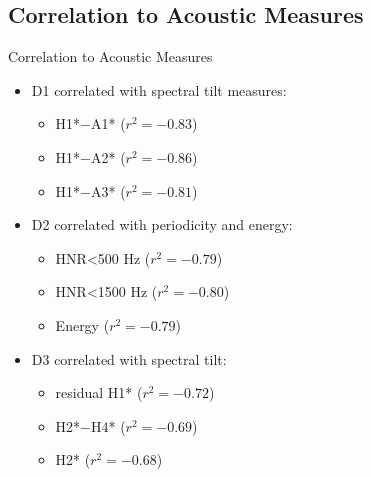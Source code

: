 \documentclass{beamer}
\begin{document}
\subsection{Correlation to Acoustic Measures}
\begin{frame}{Correlation to Acoustic Measures}
  \begin{itemize}
    \item D1 correlated with spectral tilt measures: 
    \begin{itemize}
      \item H1*$-$A1* ($r^2 = -0.83$) 
      \item H1*$-$A2* ($r^2 = -0.86$)
      \item H1*$-$A3* ($r^2 = -0.81$)
    \end{itemize}
    \item D2 correlated with periodicity and energy: 
    \begin{itemize}
      \item HNR\textless 500 Hz ($r^2 = -0.79$)
      \item HNR\textless 1500 Hz ($r^2 = -0.80$)
      \item Energy ($r^2 = -0.79$)
    \end{itemize}
    \item D3 correlated with spectral tilt:
    \begin{itemize}
      \item residual H1* ($r^2 = -0.72$)
      \item H2*$-$H4* ($r^2 = -0.69$)
      \item H2* ($r^2 = -0.68$)
    \end{itemize}
  \end{itemize}
\end{frame}
\end{document}
